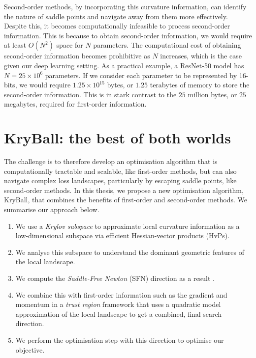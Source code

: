 Second-order methods, by incorporating this curvature information, can identify the nature of saddle points and navigate away from them more effectively. Despite this, it becomes computationally infeasible to process second-order information. This is because to obtain second-order information, we would require at least $O(N^2)$ space for $N$ parameters. The computational cost of obtaining second-order information becomes prohibitive as $N$ increases, which is the case given our deep learning setting. As a practical example, a ResNet-50 model has $N = 25 \times 10^6$ parameters. If we consider each parameter to be represented by 16-bits, we would require $1.25 \times 10^{15}$ bytes, or $1.25$ terabytes of memory to store the second-order information. This is in stark contrast to the $25$ million bytes, or $25$ megabytes, required for first-order information.

\section{KryBall: the best of both worlds}
\label{sec:kryball_intro}

The challenge is to therefore develop an optimisation algorithm that is computationally tractable and scalable, like first-order methods, but can also navigate complex loss landscapes, particularly by escaping saddle points, like second-order methods. In this thesis, we propose a new optimisation algorithm, KryBall, that combines the benefits of first-order and second-order methods. We summarise our approach below.

\begin{enumerate}
  \item We use a \textit{Krylov subspace} to approximate local curvature information as a low-dimensional subspace via efficient Hessian-vector products (HvPs).
  \item We analyse this subspace to understand the dominant geometric features of the local landscape. 
  \item We compute the \textit{Saddle-Free Newton} (SFN) direction as a result \citep{dauphin2014sfn}.
  \item We combine this with first-order information such as the gradient and momentum in a \textit{trust region} framework that uses a quadratic model approximation of the local landscape to get a combined, final search direction.
  \item We perform the optimisation step with this direction to optimise our objective.
\end{enumerate}

